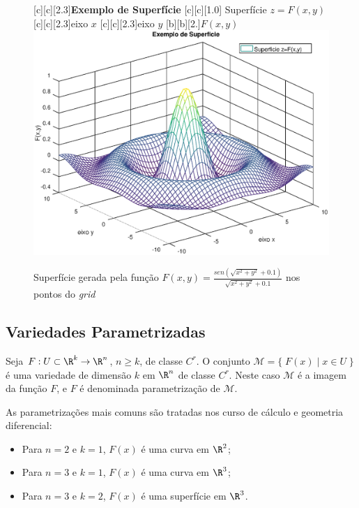 \begin{figure}[htpb]
\begin{center} 
[c][c][2.3]{\textbf{Exemplo de Superfície}}
[c][c][1.0]{\hspace{0.3cm} Superfície $z=F(x,y)$}
[c][c][2.3]{eixo $x$}
[c][c][2.3]{eixo $y$}
[b][b][2.]{$F(x,y)$}
\includegraphics*[angle=0,scale=0.55]{imagens/cap2/malha.eps} 
\caption{Superfície gerada pela função $F(x,y)=\frac{sen(\sqrt{x^2+y^2}+0.1)}{\sqrt{x^2+y^2}+0.1}$ nos pontos do {\it grid}} 
\label{fig.3d_2}
\end{center}
\end{figure}

\newpage 

\subsection{Variedades Parametrizadas}\label{var_param}

Seja $F: U \subset \R^k \rightarrow \R^n$, $ n \geq k$, de classe $C^r$. O conjunto
$\mathcal{M} = \{ \; F(x) \; | \; x \in U \; \}$ é uma variedade de dimensão $k$ em $\R^{n}$ de classe $C^r$.
Neste caso $\mathcal{M}$ é a imagem da função $F$, e $F$ é denominada parametrização de $\mathcal{M}$.

As parametrizações mais comuns são tratadas nos curso de c\'alculo e geometria diferencial:
\begin{itemize}
 \item Para $n=2$ e $k=1$, $F(x)$ \'e uma curva em $\R^2$;
 \item Para $n=3$ e $k=1$, $F(x)$ \'e uma curva em $\R^3$;
 \item Para $n=3$ e $k=2$, $F(x)$ \'e uma superf\'icie em $\R^3$.
\end{itemize}


